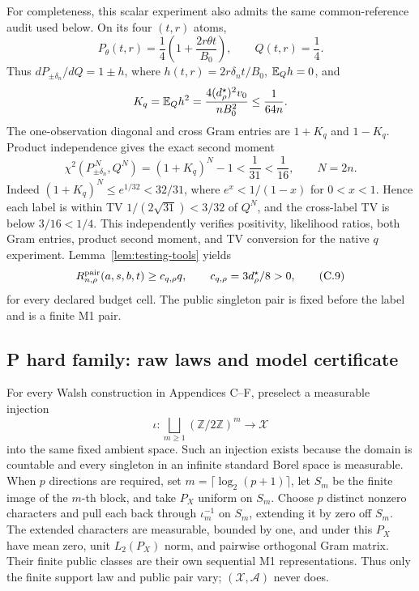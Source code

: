 For completeness, this scalar experiment also admits the same
common-reference audit used below.  On its four \((t,r)\) atoms,
\[
 P_\theta(t,r)=\frac14\left(1+\frac{2r\theta t}{B_0}\right),
 \qquad Q(t,r)=\frac14.
\]
Thus \(dP_{\pm\delta_n}/dQ=1\pm h\), where
\(h(t,r)=2r\delta_nt/B_0\), \(\mathbb E_Qh=0\), and
\[
 K_q=\mathbb E_Qh^2=\frac{4(d_\rho^\star)^2v_0}{nB_0^2}
 \le\frac1{64n}.
\]
The one-observation diagonal and cross Gram entries are \(1+K_q\) and
\(1-K_q\).  Product independence gives the exact second moment
\[
 \chi^2(P_{\pm\delta_n}^{\,N},Q^N)=(1+K_q)^N-1
 <\frac1{31}<\frac1{16},\qquad N=2n.
\]
Indeed \((1+K_q)^N\le e^{1/32}<32/31\), where
\(e^x<1/(1-x)\) for \(0<x<1\).  Hence each label is within TV
\(1/(2\sqrt{31})<3/32\) of \(Q^N\), and the cross-label TV is below
\(3/16<1/4\).  This independently verifies positivity, likelihood
ratios, both Gram entries, product second moment, and TV conversion for the
native \(q\) experiment.
Lemma~\ref{lem:testing-tools} yields
\begin{equation}
 R^{\mathrm{pair}}_{n,\rho}(a,s,b,t)\ge c_{q,\rho}q,\qquad
 c_{q,\rho}=3d_\rho^\star/8>0,
 \tag{C.9}
\end{equation}
for every declared budget cell.  The public singleton pair is fixed before
the label and is a finite M1 pair.

\subsection{P hard family: raw laws and model certificate}
\label{app:p-raw}

For every Walsh construction in Appendices C--F, preselect a measurable
injection
\[
 \iota:\bigsqcup_{m\ge1}(\mathbb Z/2\mathbb Z)^m\longrightarrow\mathcal X
\]
into the same fixed ambient space.  Such an injection exists because the
domain is countable and every singleton in an infinite standard Borel space
is measurable.  When \(p\) directions are required, set
\(m=\lceil\log_2(p+1)\rceil\), let \(S_m\) be the finite image of the
\(m\)-th block, and take \(P_X\) uniform on \(S_m\).  Choose \(p\) distinct
nonzero characters and pull each back through \(\iota_m^{-1}\) on \(S_m\),
extending it by zero off \(S_m\).  The extended characters are measurable,
bounded by one, and under this \(P_X\) have mean zero, unit \(L_2(P_X)\)
norm, and pairwise orthogonal Gram matrix.  Their finite public classes are
their own sequential M1 representations.  Thus only the finite support law
and public pair vary; \((\mathcal X,\mathcal A)\) never does.

